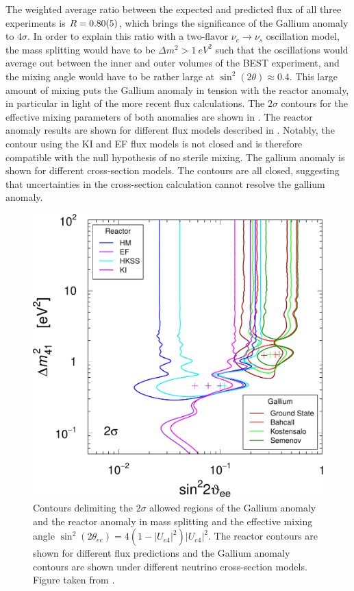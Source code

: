 The weighted average ratio between the expected and predicted flux of all three experiments is $R=\num{0.8+-0.05}$, which brings the significance of the Gallium anomaly to $4\sigma$.
In order to explain this ratio with a two-flavor $\nu_e \rightarrow \nu_s$ oscillation model, the mass splitting would have to be $\Delta m^2 > \SI{1}{eV^2}$ such that the oscillations would average out between the inner and outer volumes of the BEST experiment, and the mixing angle would have to be rather large at $\sin^2(2\theta)\approx 0.4$.
This large amount of mixing puts the Gallium anomaly in tension with the reactor anomaly, in particular in light of the more recent flux calculations.
The $2\sigma$ contours for the effective mixing parameters of both anomalies are shown in .
The reactor anomaly results are shown for different flux models described in \cite{Giunti_2022}.
Notably, the contour using the KI and EF flux models is not closed and is therefore compatible with the null hypothesis of no sterile mixing.
The gallium anomaly is shown for different cross-section models.
The contours are all closed, suggesting that uncertainties in the cross-section calculation cannot resolve the gallium anomaly.
\begin{figure}
    \centering
    \includegraphics[width=0.7\linewidth]{figures/theory/see-gal-rat-2s.pdf}
    \caption{Contours delimiting the $2\sigma$ allowed regions of the Gallium anomaly and the reactor anomaly in mass splitting and the effective mixing angle $\sin^2(2\theta_{ee}) = 4 (1-|U_{e4}|^2)|U_{e4}|^2$. The reactor contours are shown for different flux predictions and the Gallium anomaly contours are shown under different neutrino cross-section models. Figure taken from \cite{Giunti_2022}.\label{fig:best-contours}}
\end{figure}


